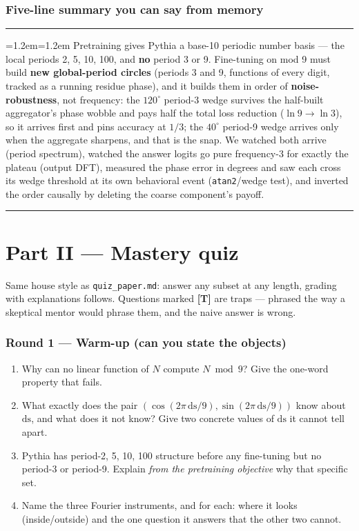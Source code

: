 \documentclass[11pt]{article}
\newenvironment{keybox}
  {\par\vspace{7pt}\noindent\hrule\vspace{5pt}%
   \begingroup\leftskip=1.2em\rightskip=1.2em\noindent\ignorespaces}
  {\par\endgroup\vspace{5pt}\hrule\vspace{7pt}}
\newcommand{\ds}{\mathrm{ds}}
\newcommand{\trap}{\textcolor{trapcol}{\textbf{[T]}}}
\begin{document}
\section{Five-line summary you can say from memory}

\begin{keybox}
Pretraining gives Pythia a base-10 periodic number basis --- the local periods
2, 5, 10, 100, and \textbf{no} period 3 or 9. Fine-tuning on mod 9 must build
\textbf{new global-period circles} (periods 3 and 9, functions of every digit,
tracked as a running residue phase), and it
builds them in order of \textbf{noise-robustness}, not frequency: the $120^\circ$
period-3 wedge survives the half-built aggregator's phase wobble and pays half the
total loss reduction ($\ln 9 \to \ln 3$), so it arrives first and pins accuracy at
$1/3$; the $40^\circ$ period-9 wedge arrives only when the aggregate sharpens, and
that is the snap. We watched both arrive (period spectrum), watched the answer
logits go pure frequency-3 for exactly the plateau (output DFT), measured the
phase error in degrees and saw each cross its wedge threshold at its own
behavioral event (\texttt{atan2}/wedge test), and inverted the order causally by
deleting the coarse component's payoff.
\end{keybox}

\newpage
\part*{Part II --- Mastery quiz}

Same house style as \texttt{quiz\_paper.md}: answer any subset at any length,
grading with explanations follows. Questions marked \trap{} are traps --- phrased
the way a skeptical mentor would phrase them, and the naive answer is wrong.

\section*{Round 1 --- Warm-up (can you state the objects)}
\begin{enumerate}[leftmargin=*,itemsep=4pt]
\item Why can no linear function of $N$ compute $N \bmod 9$? Give the one-word
property that fails.
\item What exactly does the pair $(\cos(2\pi\,\ds/9), \sin(2\pi\,\ds/9))$ know
about $\ds$, and what does it not know? Give two concrete values of $\ds$ it cannot
tell apart.
\item Pythia has period-2, 5, 10, 100 structure before any fine-tuning but no
period-3 or period-9. Explain \emph{from the pretraining objective} why that
specific set.
\item Name the three Fourier instruments, and for each: where it looks
(inside/outside) and the one question it answers that the other two cannot.
\end{enumerate}
\end{document}
